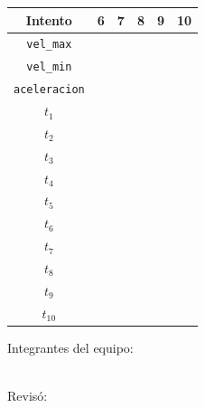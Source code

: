 	\vspace{0.5cm}

	\begin{tabular}{|c|c|c|c|c|c|}
		 \hline
		 Intento & 6 & 7 & 8 & 9 & 10 \\
		 \hline
		 \texttt{vel\_max} & \hspace{1.7cm} & \hspace{1.7cm} & \hspace{1.7cm} & \hspace{1.7cm} & \hspace{1.7cm} \\
		 \hline
		 \texttt{vel\_min} & & & & & \\
		 \hline
		 \texttt{aceleracion} & & & & & \\
		 \hline
		 $t_1$ & & & & & \\
		 \hline
		 $t_2$ & & & & & \\
		 \hline
		 $t_3$ & & & & & \\
		 \hline
		 $t_4$ & & & & & \\
		 \hline
		 $t_5$ & & & & & \\
		 \hline
		 $t_6$ & & & & & \\
		 \hline
		 $t_7$ & & & & & \\
		 \hline
		 $t_8$ & & & & & \\
		 \hline
		 $t_9$ & & & & & \\
		 \hline
		 $t_{10}$ & & & & & \\
		 \hline
	\end{tabular}

	\begin{multicols}{2}
		Integrantes del equipo: \\[0.4cm]
		\horrule{0.5pt} \\[0.4cm] %
		\horrule{0.5pt} %

		Revisó: \\[1.25cm]
		\horrule{0.5pt} \\%
	\end{multicols}



